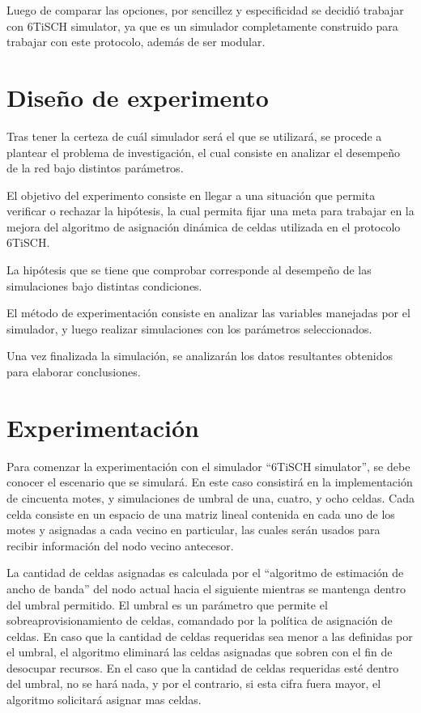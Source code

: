 Luego de comparar las opciones, por sencillez y especificidad se decidió trabajar con 6TiSCH simulator, ya que es un simulador completamente construido para trabajar con este protocolo, además de ser modular.

\section{Diseño de experimento}

Tras tener la certeza de cuál simulador será el que se utilizará, se procede a plantear el problema de investigación, el cual consiste en analizar el desempeño de la red bajo distintos parámetros.

El objetivo del experimento consiste en llegar a una situación que permita verificar o rechazar la hipótesis, la cual permita fijar una meta para trabajar en la mejora del algoritmo de asignación dinámica de celdas utilizada en el protocolo 6TiSCH.

La hipótesis que se tiene que comprobar corresponde al desempeño de las simulaciones bajo distintas condiciones.

El método de experimentación consiste en analizar las variables manejadas por el simulador, y luego realizar simulaciones con los parámetros seleccionados.

Una vez finalizada la simulación, se analizarán los datos resultantes obtenidos para elaborar conclusiones.



\section{Experimentación}
Para comenzar la experimentación con el simulador ``6TiSCH simulator'', se debe conocer el escenario que se simulará. En este caso consistirá en la implementación de cincuenta motes, y simulaciones de umbral de una, cuatro, y ocho celdas. Cada celda consiste en un espacio de una matriz lineal contenida en cada uno de los motes y asignadas a cada vecino en particular, las cuales serán usados para recibir información del nodo vecino antecesor.

La cantidad de celdas asignadas es calculada por el ``algoritmo de estimación de ancho de banda'' del nodo actual hacia el siguiente mientras se mantenga dentro del umbral permitido. El umbral es un parámetro que permite el sobreaprovisionamiento de celdas, comandado por la política de asignación de celdas. En caso que la cantidad de celdas requeridas sea menor a las definidas por el umbral, el algoritmo eliminará las celdas asignadas que sobren con el fin de desocupar recursos. En el caso que la cantidad de celdas requeridas esté dentro del umbral, no se hará nada, y por el contrario, si esta cifra fuera mayor, el algoritmo solicitará asignar mas celdas. 

